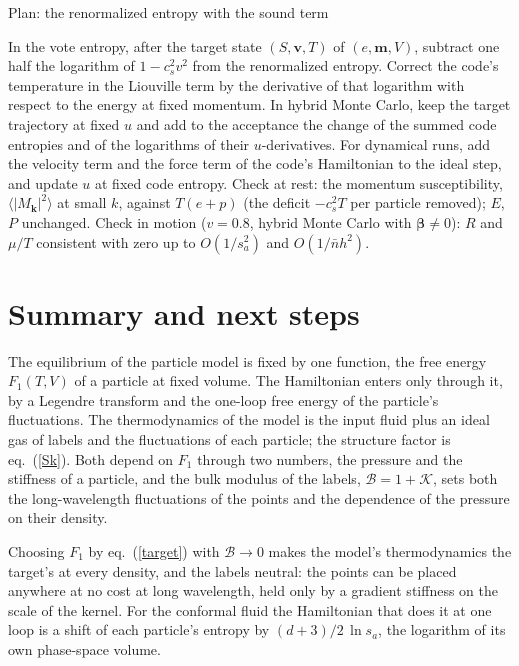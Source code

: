 \documentclass[11pt,aps,preprint,nofootinbib,superscriptaddress,tightenlines]{revtex4-2}
\newcommand{\avg}[1]{\langle #1\rangle}
\newcommand{\klab}{\mathcal B}
\def\Eq#1{eq.~(\ref{#1})}
\begin{document}
\begin{algobox}{Plan: the renormalized entropy with the sound term}
\begin{algorithmic}[1]
\State In the vote entropy, after the target state $(S,\bm v,T)$ of $(e,\bm m,V)$, subtract one half the logarithm of $1-c_s^2v^2$ from the renormalized entropy.
\State Correct the code's temperature in the Liouville term by the derivative of that logarithm with respect to the energy at fixed momentum.
\State In hybrid Monte Carlo, keep the target trajectory at fixed $u$ and add to the acceptance the change of the summed code entropies and of the logarithms of their $u$-derivatives.
\State For dynamical runs, add the velocity term and the force term of the code's Hamiltonian to the ideal step, and update $u$ at fixed code entropy.
\State Check at rest: the momentum susceptibility, $\avg{|M_{\bm k}|^2}$ at small $k$, against $T(e+p)$ (the deficit $-c_s^2T$ per particle removed); $E$, $P$ unchanged.
\State Check in motion ($v=0.8$, hybrid Monte Carlo with $\bm\beta\neq0$): $R$ and $\mu/T$ consistent with zero up to $O(1/s_a^2)$ and $O(1/\bar nh^2)$.
\end{algorithmic}
\end{algobox}

\section{Summary and next steps}
\label{sec:summary}

The equilibrium of the particle model is fixed by one function, the free energy $F_1(T,V)$ of a particle at fixed volume.  The Hamiltonian enters only through it,
by a Legendre transform and the one-loop free energy of the particle's fluctuations.  The thermodynamics of the model is the input fluid plus an ideal gas of
labels and the fluctuations of each particle; the structure factor is \Eq{Sk}.  Both depend on $F_1$ through two numbers, the pressure and the stiffness of a particle,
and the bulk modulus of the labels, $\klab=1+\mathcal K$, sets both the long-wavelength fluctuations of the points and the dependence of the pressure on their density.

Choosing $F_1$ by \Eq{target} with $\klab\to0$ makes the model's thermodynamics the target's at every density, and the labels neutral: the points can be placed anywhere at
no cost at long wavelength, held only by a gradient stiffness on the scale of the kernel.  For the conformal fluid the Hamiltonian that does it at one loop is a shift
of each particle's entropy by $(d+3)/2\,\ln s_a$, the logarithm of its own phase-space volume.
\end{document}
